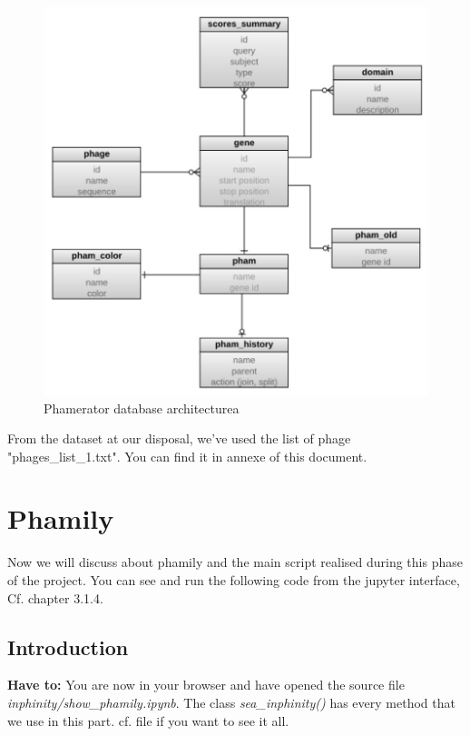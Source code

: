 \documentclass[a4paper,11pt]{report}
\begin{document}
\begin{figure}[H] 
	\begin{center}
		\includegraphics[scale=0.52]{img/12859_2011_Article_4954_Fig1_HTML}
		\caption{Phamerator database architecturea}
	\end{center}
\end{figure}

From the dataset at our disposal, we've used the list of phage "phages\_list\_1.txt". You can find it in annexe of this document.


\section{Phamily}
Now we will discuss about phamily and the main script realised during this phase of the project. You can see and run the following code from the jupyter interface, Cf. chapter 3.1.4.

\subsection{Introduction}

\textbf{Have to:} You are now in your browser and have opened the source file \textit{inphinity/show\_phamily.ipynb}. The class \textit{sea\_inphinity()} has every method that we use in this part. cf. file if you want to see it all.
\end{document}
